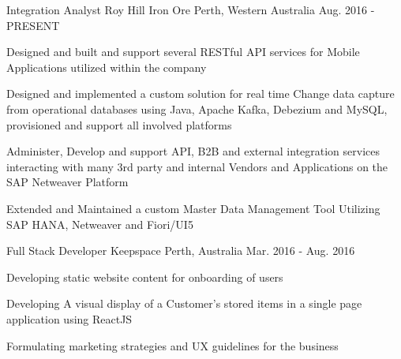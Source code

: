 

\begin{cventries}

  \cventry
    {Integration Analyst } %
    {Roy Hill Iron Ore} %
    {Perth, Western Australia} %
    {Aug. 2016 - PRESENT} %
    {
      \begin{cvitems} %
        \item {Designed and built and support several RESTful API services for Mobile Applications utilized within the company}
        \item {Designed and implemented a custom solution for real time Change data capture from operational databases using Java, Apache Kafka, Debezium and MySQL, provisioned and support all involved platforms}
        \item {Administer, Develop and support API, B2B and external integration services interacting with many 3rd party and internal Vendors and Applications on the SAP Netweaver Platform}
        \item {Extended and Maintained a custom Master Data Management Tool Utilizing SAP HANA, Netweaver and Fiori/UI5}
      \end{cvitems}
    }

  \cventry
    {Full Stack Developer} %
    {Keepspace} %
    {Perth, Australia} %
    {Mar. 2016 - Aug. 2016} %
    {
      \begin{cvitems} %
        \item {Developing static website content for onboarding of users}
        \item {Developing A visual display of a Customer’s stored items in a single page application using ReactJS }
        \item {Formulating marketing strategies and UX guidelines for the business}
      \end{cvitems}
    }


\end{cventries}
